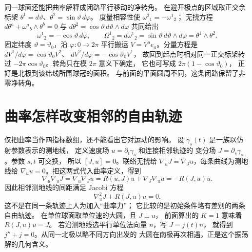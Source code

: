 同一球面还能把曲率解释成闭路平行移动的净转角。
在避开极点的区域取正交余标架
\(\theta^1=d\vartheta\)、\(\theta^2=\sin\vartheta\,d\varphi\)。
度量相容性使 \(\omega^2{}_1=-\omega^1{}_2\)；
无挠方程 \(d\theta^a+\omega^a{}_b\wedge\theta^b=0\)
与 \(d\theta^2=\cos\vartheta\,d\vartheta\wedge d\varphi\)
共同给出
\[
\omega^1{}_2=-\cos\vartheta\,d\varphi,
\qquad
\Omega^1{}_2=d\omega^1{}_2
=\sin\vartheta\,d\vartheta\wedge d\varphi
=\theta^1\wedge\theta^2.
\]
固定纬度 \(\vartheta=\vartheta_0\)，沿 \(\varphi:0\to2\pi\)
平行搬运 \(V=V^ae_a\)。分量方程是
\(dV^1/d\varphi=\cos\vartheta_0 V^2\)、
\(dV^2/d\varphi=-\cos\vartheta_0 V^1\)，
故回到起点时相对同一正交标架转过
\(-2\pi\cos\vartheta_0\)。转角只在模 \(2\pi\) 意义下确定，
它也可写成 \(2\pi(1-\cos\vartheta_0)\)，
正好是北极到该纬线所围球冠的面积。
与前面的平面圆周不同，这条闭路保留了非零净转角。

\section{曲率怎样改变相邻的自由轨迹}

仅把曲率当作四指标数组，还不能看出它对运动的影响。
设 \(\gamma_s(t)\) 是一族以仿射参数表示的测地线，
定义速度场 \(u=\partial_t\gamma_s\) 和连接相邻轨迹的
变分场 \(J=\partial_s\gamma_s\)。参数 \(s,t\) 可交换，
所以 \([J,u]=0\)。联络无挠给
\(\nabla_uJ=\nabla_Ju\)，每条曲线为测地线给
\(\nabla_uu=0\)。把这两式代入曲率定义，得到
\[
\nabla_u\nabla_uJ
=\nabla_u\nabla_Ju
=R(u,J)u+\nabla_J\nabla_uu
=-R(J,u)u.
\]
因此相邻测地线的间距满足 Jacobi 方程
\begin{equation}
\nabla_u^2J+R(J,u)u=0.
\label{eq:math-jacobi-equation}
\end{equation}
这不是在同一条轨迹上人为加入“曲率力”；
它比较的是初始条件略有差别的两条自由轨迹。
在单位球面取单位速的大圆，且 \(J\perp u\)，
前面算出的 \(K=1\) 意味着 \(R(J,u)u=J\)。
若沿测地线选平行单位法向量 \(n\)，写 \(J=j(t)n\)，
就得到 \(j''+j=0\)。从同一北极以略不同方向出发的
大圆在南极再次相遇，正是这个振荡解的几何含义。


